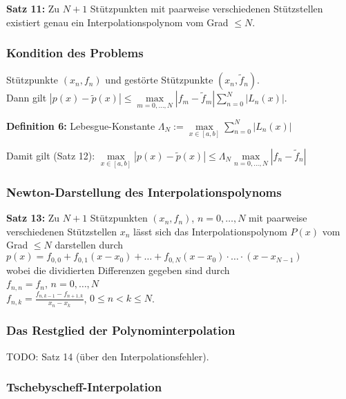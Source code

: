 \documentclass[a4paper]{article}
\begin{document}
\textbf{Satz 11:} Zu $N + 1$ Stützpunkten mit paarweise verschiedenen
Stützstellen existiert genau ein Interpolationspolynom vom Grad $\le N$.

\subsubsection{Kondition des Problems}

Stützpunkte $(x_n, f_n)$ und gestörte Stützpunkte $(x_n, \tilde{f}_n)$.
\\
Dann gilt $|p(x) - \tilde{p}(x)| \le \max\limits_{m = 0, \dots, N} |f_m -
\tilde{f}_m| \sum\limits_{n = 0}^N |L_n(x)|$.

\textbf{Definition 6:} Lebesgue-Konstante $\Lambda_N := \max\limits_{x \in [a, b]} \sum\limits_{n=
0}^N |L_n(x)|$

Damit gilt (Satz 12): $\max\limits_{x \in [a, b]} |p(x) - \tilde{p}(x)| \le
\Lambda_N \max\limits_{n = 0, \dots, N} |f_n - \tilde{f}_n|$

\subsubsection{Newton-Darstellung des Interpolationspolynoms}

\textbf{Satz 13:} Zu $N + 1$ Stützpunkten $(x_n, f_n)$, $n = 0, \dots, N$ mit
paarweise verschiedenen Stützstellen $x_n$ lässt sich das Interpolationspolynom
$P(x)$ vom Grad $\le N$ darstellen durch \\
$p(x) = f_{0, 0} + f_{0, 1} (x - x_0) + \dots + f_{0, N} (x - x_0) \cdot \ldots
\cdot (x - x_{N - 1})$
\\
wobei die dividierten Differenzen gegeben sind durch
\\
$f_{n, n} = f_n$, \hspace{7em} $n = 0, \ldots, N$
\\
$f_{n, k} = \frac{f_{n, k - 1} - f_{n + 1, k}}{x_n - x_k}$, \hspace{2.5em} $0
\le n < k \le N$.

\subsubsection{Das Restglied der Polynominterpolation}

TODO: Satz 14 (über den Interpolationsfehler).

\subsubsection{Tschebyscheff-Interpolation}
\end{document}
